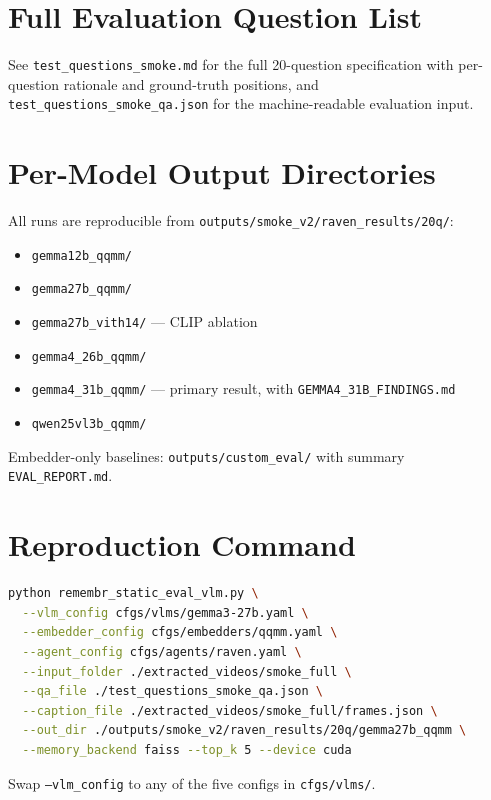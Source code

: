 \documentclass[11pt]{article}
\begin{document}
\appendix

\section{Full Evaluation Question List}
See \texttt{test\_questions\_smoke.md} for the full 20-question specification with per-question rationale and ground-truth positions, and \texttt{test\_questions\_smoke\_qa.json} for the machine-readable evaluation input.

\section{Per-Model Output Directories}
All runs are reproducible from \texttt{outputs/smoke\_v2/raven\_results/20q/}:
\begin{itemize}[leftmargin=*,itemsep=1pt]
  \item \texttt{gemma12b\_qqmm/}
  \item \texttt{gemma27b\_qqmm/}
  \item \texttt{gemma27b\_vith14/} --- CLIP ablation
  \item \texttt{gemma4\_26b\_qqmm/}
  \item \texttt{gemma4\_31b\_qqmm/} --- primary result, with \texttt{GEMMA4\_31B\_FINDINGS.md}
  \item \texttt{qwen25vl3b\_qqmm/}
\end{itemize}
Embedder-only baselines: \texttt{outputs/custom\_eval/} with summary \texttt{EVAL\_REPORT.md}.

\section{Reproduction Command}
\begin{lstlisting}[language=bash]
python remembr_static_eval_vlm.py \
  --vlm_config cfgs/vlms/gemma3-27b.yaml \
  --embedder_config cfgs/embedders/qqmm.yaml \
  --agent_config cfgs/agents/raven.yaml \
  --input_folder ./extracted_videos/smoke_full \
  --qa_file ./test_questions_smoke_qa.json \
  --caption_file ./extracted_videos/smoke_full/frames.json \
  --out_dir ./outputs/smoke_v2/raven_results/20q/gemma27b_qqmm \
  --memory_backend faiss --top_k 5 --device cuda
\end{lstlisting}
Swap \texttt{--vlm\_config} to any of the five configs in \texttt{cfgs/vlms/}.
\end{document}
